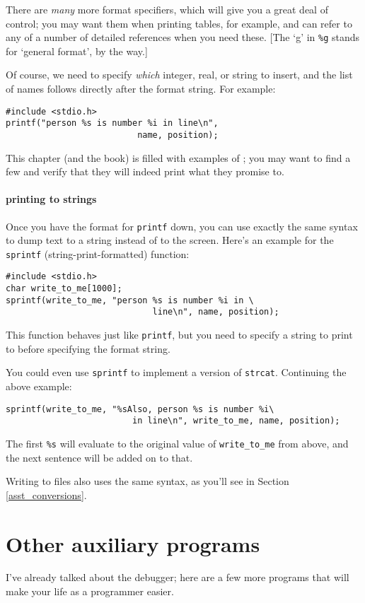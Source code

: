 \documentclass[12pt]{article}
\makeatletter
\def\ttind#1{\index{#1@{\tt #1}}{\tt #1}}
\makeatother
\begin{document}
There are {\sl many} more format specifiers, which will give you a great deal of control; you may want
them when printing tables, for example, and can refer to any of a number of detailed references when you
need these. [The `g' in {\tt \%g} stands for `general format', by the way.]

Of course, we need to specify {\sl which} integer, real, or string to insert, and the list of names
follows directly after the format string. For example:
\begin{verbatim}
#include <stdio.h>
printf("person %s is number %i in line\n", 
                          name, position);
\end{verbatim}
This chapter (and the book) is filled with examples of \ttind{printf}; you may want to find a few and
verify that they will indeed print what they promise to.

\paragraph{printing to strings} Once you have the format for {\tt printf} down, you can use exactly the
same syntax to dump text to a string instead of to the screen. Here's an example for the {\tt sprintf}
(string-print-formatted) function:
\begin{verbatim}
#include <stdio.h>
char write_to_me[1000];
sprintf(write_to_me, "person %s is number %i in \
                             line\n", name, position);
\end{verbatim}
This function behaves just like {\tt printf}, but you need to specify
a string to print to before specifying the format string. 

You could even use {\tt sprintf} to implement a version of {\tt strcat}. Continuing the above example:
\begin{verbatim}
sprintf(write_to_me, "%sAlso, person %s is number %i\
                         in line\n", write_to_me, name, position);
\end{verbatim}
The first {\tt \%s} will evaluate to the original value of {\tt write\_to\_me} from above, and the next
sentence will be added on to that.

Writing to files also uses the same syntax, as you'll see in Section \ref{asst_conversions}.

\section{Other auxiliary programs} I've already talked about the debugger; here
are a few more programs that will make your life as a programmer easier.
\end{document}
